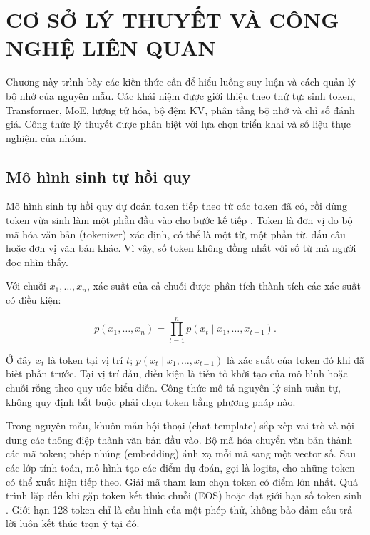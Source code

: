 \chapter{CƠ SỞ LÝ THUYẾT VÀ CÔNG NGHỆ LIÊN QUAN}


Chương này trình bày các kiến thức cần để hiểu luồng suy luận và cách quản lý bộ nhớ của nguyên mẫu. Các khái niệm được giới thiệu theo thứ tự: sinh token, Transformer, MoE, lượng tử hóa, bộ đệm KV, phân tầng bộ nhớ và chỉ số đánh giá. Công thức lý thuyết được phân biệt với lựa chọn triển khai và số liệu thực nghiệm của nhóm.

\section{Mô hình sinh tự hồi quy}

Mô hình sinh tự hồi quy dự đoán token tiếp theo từ các token đã có, rồi dùng token vừa sinh làm một phần đầu vào cho bước kế tiếp \cite{vaswani_attention}. Token là đơn vị do bộ mã hóa văn bản (tokenizer) xác định, có thể là một từ, một phần từ, dấu câu hoặc đơn vị văn bản khác. Vì vậy, số token không đồng nhất với số từ mà người đọc nhìn thấy.

Với chuỗi $x_1,\ldots,x_n$, xác suất của cả chuỗi được phân tích thành tích các xác suất có điều kiện:

\begin{equation}
\label{eq:2.1}
p(x_1,\ldots,x_n)=\prod_{t=1}^{n}p(x_t\mid x_1,\ldots,x_{t-1}).
\end{equation}

Ở đây $x_t$ là token tại vị trí $t$; $p(x_t\mid x_1,\ldots,x_{t-1})$ là xác suất của token đó khi đã biết phần trước. Tại vị trí đầu, điều kiện là tiền tố khởi tạo của mô hình hoặc chuỗi rỗng theo quy ước biểu diễn. Công thức mô tả nguyên lý sinh tuần tự, không quy định bắt buộc phải chọn token bằng phương pháp nào.

Trong nguyên mẫu, khuôn mẫu hội thoại (chat template) sắp xếp vai trò và nội dung các thông điệp thành văn bản đầu vào. Bộ mã hóa chuyển văn bản thành các mã token; phép nhúng (embedding) ánh xạ mỗi mã sang một vector số. Sau các lớp tính toán, mô hình tạo các điểm dự đoán, gọi là logits, cho những token có thể xuất hiện tiếp theo. Giải mã tham lam chọn token có điểm lớn nhất. Quá trình lặp đến khi gặp token kết thúc chuỗi (EOS) hoặc đạt giới hạn số token sinh \cite{moe_tierengine_arch}. Giới hạn 128 token chỉ là cấu hình của một phép thử, không bảo đảm câu trả lời luôn kết thúc trọn ý tại đó.

